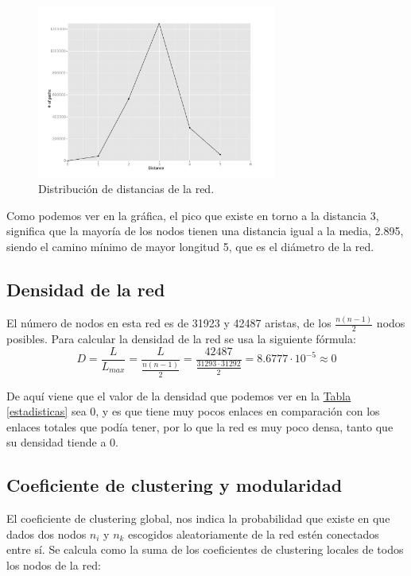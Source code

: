 \documentclass[paper=a4, fontsize=11pt]{article} %
\numberwithin{equation}{section} %
\numberwithin{figure}{section} %
\numberwithin{table}{section} %
\begin{document}
\begin{figure}[H]
  \centering
  \includegraphics[width=0.7\textwidth]{dist_hist}
  \caption{Distribución de distancias de la red.}
  \label{im2}
\end{figure}

Como podemos ver en la gráfica, el pico que existe en torno a la distancia 3, significa que la mayoría de los nodos tienen una distancia igual a la media, 2.895, siendo el camino mínimo de mayor longitud 5, que es el diámetro de la red.

\subsection{Densidad de la red}

El número de nodos en esta red es de 31923 y 42487 aristas, de los $\frac{n(n-1)}{2}$ nodos posibles. Para calcular la densidad de la red se usa la siguiente fórmula:
\begin{displaymath}
    D = \frac{L}{L_{max}} = \frac{L}{\frac{n(n-1)}{2}} = \frac{42487}{\frac{31293\cdot31292}{2}} = 8.6777\cdot10^{-5} \approx 0
\end{displaymath}

De aquí viene que el valor de la densidad que podemos ver en la \hyperref[estadisticas]{Tabla \ref*{estadisticas}} sea 0, y es que tiene muy pocos enlaces en comparación con los enlaces totales que podía tener, por lo que la red es muy poco densa, tanto que su densidad tiende a 0.

\subsection{Coeficiente de clustering y modularidad}

El coeficiente de clustering global, nos indica la probabilidad que existe en que dados dos nodos $n_i$ y $n_k$ escogidos aleatoriamente de la red estén conectados entre sí. Se calcula como la suma de los coeficientes de clustering locales de todos los nodos de la red:
\end{document}
